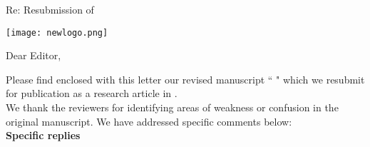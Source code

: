 \documentclass{letter}
\newcommand{\msTitle}{ } %
\newcommand{\subID}{ } %
\newcommand{\Jname}{ } %
\begin{document}
 
\begin{letter} {Re:  Resubmission of \textit{\msTitle{} \subID{}}} %


\texttt{[image: newlogo.png]}


\opening{Dear Editor, }


Please find enclosed with this letter our revised manuscript ``\msTitle" which we resubmit for publication as a research article in \textit{\Jname{}}.\\



We thank the reviewers for identifying areas of weakness or confusion in the original manuscript.  
 We have addressed specific comments below: \\

\textbf{Specific replies}



\end{letter}
\end{document}
